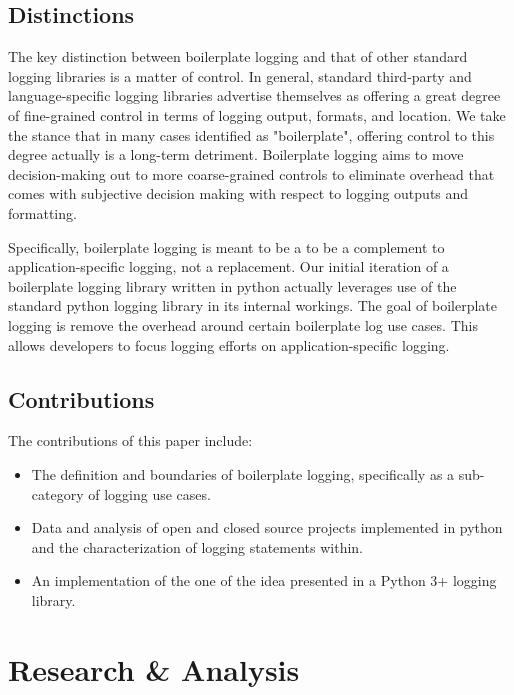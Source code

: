 \documentclass[acmsmall,review,authorversion]{acmart}
\begin{document}
    \subsection{Distinctions}

    The key distinction between boilerplate logging and that of other standard logging libraries is a matter of control. In general, standard third-party and language-specific logging libraries advertise themselves as offering a great degree of fine-grained control in terms of logging output, formats, and location. We take the stance that in many cases identified as "boilerplate", offering control to this degree actually is a long-term detriment. Boilerplate logging aims to move decision-making out to more coarse-grained controls to eliminate overhead that comes with subjective decision making with respect to logging outputs and formatting.

    Specifically, boilerplate logging is meant to be a to be a complement to application-specific logging, not a replacement. Our initial iteration of a boilerplate logging library written in python actually leverages use of the standard python logging library in its internal workings. The goal of boilerplate logging is remove the overhead around certain boilerplate log use cases. This allows developers to focus logging efforts on application-specific logging.

    \subsection{Contributions}

    The contributions of this paper include:

    \begin{itemize}
        \item The definition and boundaries of boilerplate logging, specifically as a sub-category of logging use cases.
        \item Data and analysis of open and closed source projects implemented in python and the characterization of logging statements within.
        \item An implementation of the one of the idea presented in a Python 3+ logging library.
    \end{itemize}

\section{Research \& Analysis}
\end{document}
